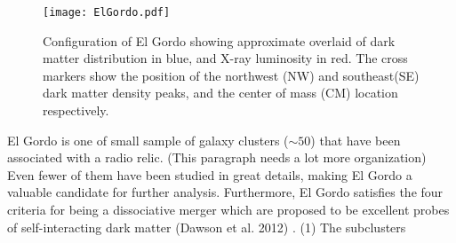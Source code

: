 %
%
\begin{figure}
	\texttt{[image: ElGordo.pdf]}
	\caption{Configuration of El Gordo showing approximate overlaid of dark
		matter distribution in blue, and X-ray luminosity in red. The cross
		markers show the position of the northwest (NW) and southeast(SE) dark
		matter density peaks, and the center of mass (CM) location respectively.   \label{fig:config}}
\end{figure}
El Gordo is one of small sample of galaxy clusters ($\sim 50$) that have
been associated with a radio relic. (This paragraph needs a lot more
organization) Even fewer of them have been studied in
great details, making El Gordo a valuable candidate for further analysis. 
%
%
Furthermore, El Gordo satisfies the four criteria for being a dissociative merger which are proposed to be excellent
probes of self-interacting dark matter (Dawson et al. 2012) . (1) The subclusters
